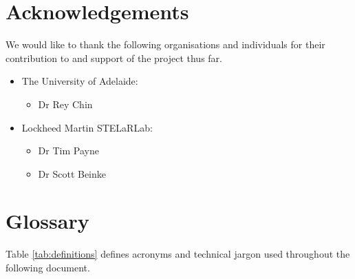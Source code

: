 
\pagestyle{empty}

\titleGP %

\newpage



\newpage

\setcounter{page}{1}

\pagestyle{fancy}
\fancyhf{}

\fancyfoot[C]{\thepage}

\newpage
%


\section*{Acknowledgements}


We would like to thank the following organisations and individuals for their contribution to and support of the project thus far.

\begin{itemize}
    \item The University of Adelaide:
    \begin{itemize}
        \item Dr Rey Chin
    \end{itemize}
    \item Lockheed Martin STELaRLab:
    \begin{itemize}
        \item Dr Tim Payne
        \item Dr Scott Beinke
    \end{itemize}
 
\end{itemize}

\vspace{2cm}
\newpage
\section*{Glossary}

Table \ref{tab:definitions} defines acronyms and technical jargon used throughout the following document. 

